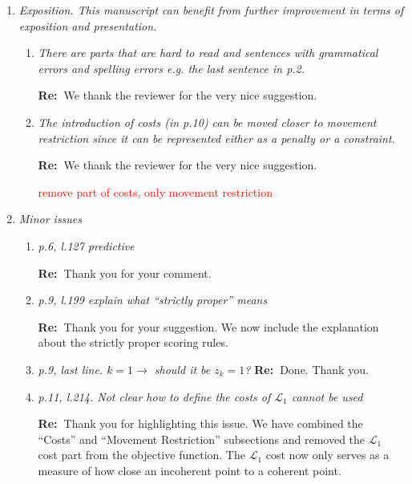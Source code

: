 \documentclass[11pt,a4paper]{article}
\newcommand{\RE}[2][Re:~]{{\color{blue}\textbf{#1}#2}}
\begin{document}
\begin{enumerate}
\item \textit{Exposition. This manuscript can benefit from further improvement in terms of exposition and presentation. }
\begin{enumerate}
    \item \textit{There are parts that are hard to read and sentences with grammatical errors and spelling errors e.g. the last sentence in p.2.}
    
    \RE{We thank the reviewer for the very nice suggestion.}
    \item \textit{The introduction of costs (in p.10) can be moved closer to movement restriction since it can be represented either as a penalty or a constraint.}
    
    \RE{We thank the reviewer for the very nice suggestion.}

    \textcolor{red}{remove part of costs, only movement restriction}
\end{enumerate}




\item \textit{ Minor issues }

  \begin{enumerate}
    \item  \textit{p.6, l.127 predictive}

    \RE{Thank you for your comment.}

    \item \textit{p.9, l.199 explain what ``strictly proper'' means}

    \RE{Thank you for your suggestion. We now include the explanation about the strictly proper scoring rules.}



    \item \textit{p.9, last line. $k = 1 \rightarrow$ should it be $z_k = 1$?}
    \RE{Done. Thank you.}
    \item \textit{p.11, l.214. Not clear how to define the costs of $\mathcal{L}_1$ cannot be used}
    
    \RE{Thank you for highlighting this issue. We have combined the ``Costs'' and ``Movement Restriction'' subsections and removed the $\mathcal{L}_1$ cost part from the objective function. The $\mathcal{L}_1$ cost now only serves as a measure of how close an incoherent point to a coherent point.}

  \end{enumerate}

\end{enumerate}
\newpage
\end{document}
